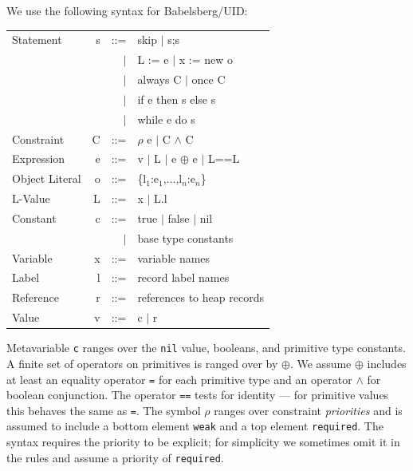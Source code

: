 \documentclass[10pt,reprint]{sigplanconf-preprint}
\renewcommand{\H}{\texttt{\upshape H}\xspace}
\newcommand{\Deref}{\H}%
\begin{document}
We use the following syntax for Babelsberg/UID:\\[.5\baselineskip]
{\ttfamily
\begin{tabular}{@{}lrrl}
\textrm{Statement} & s & ::= & skip $\mid$ s;s \\
  & & $\mid$ & L := e $\mid$ x := new o \\
  & & $\mid$ & always C $\mid$ once C \\
  & & $\mid$ & if e then s else s \\
  & & $\mid$ & while e do s \\
\textrm{Constraint} & C & ::= & $\rho$ e $\mid$ C $\wedge$ C\\
\textrm{Expression} & e & ::= & v $\mid$ L $\mid$ e $\oplus$ e %
  $\mid$ L==L \\
\textrm{Object Literal} & o & ::= &  \{l$_1$:e$_1$,$\ldots$,l$_n$:e$_n$\} \\
\textrm{L-Value} & L & ::= & x $\mid$ L.l \\
\textrm{Constant} & c & ::= & true $\mid$ false $\mid$ nil \\
  & & $\mid$ & \textrm{base type constants}\\
\textrm{Variable} & x & ::= & \textrm{variable names} \\
\textrm{Label} & l & ::= & \textrm{record label names} \\
\textrm{Reference} & r & ::= & \textrm{references to heap records} \\

\textrm{Value} & v & ::= & c $\mid$ r
\end{tabular}
}\baselineskip

Metavariable {\tt c} ranges over the {\tt nil} value, booleans, and
primitive type constants. A finite set of operators on primitives
is ranged over by $\oplus$.  We assume $\oplus$ includes at least 
an equality operator {\tt =} for each primitive type and an operator
{\tt $\wedge$} for boolean conjunction.  The operator
{\tt ==} tests for identity --- for primitive values this behaves the same
as {\tt =}. The symbol $\rho$ ranges over constraint {\em priorities}
and is assumed to include a bottom element {\tt weak} and a top
element {\tt required}. The syntax requires the priority to be
explicit; for simplicity we sometimes omit it in the rules and assume
a priority of {\tt required}.
\end{document}
